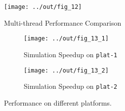 \documentclass{sig-alternate}
\begin{document}
\begin{figure*}[h!]
  \centering
  \texttt{[image: ../out/fig\_12]}
  \vspace*{-5mm}
  \caption{Multi-thread Performance Comparison}
  \label{fig:multi}
\end{figure*}

\begin{figure*}[h!]
  \begin{subfigure}{\linewidth}
    \caption{Simulation Speedup on \texttt{plat-1}}
    \texttt{[image: ../out/fig\_13\_1]}
  \end{subfigure}
  \begin{subfigure}{\linewidth}
    \caption{Simulation Speedup on \texttt{plat-2}}
    \texttt{[image: ../out/fig\_13\_2]}
  \end{subfigure}
  \vspace*{-4mm}
  \caption{Performance on different platforms. }
  \label{fig:plat}
\end{figure*}
\end{document}
